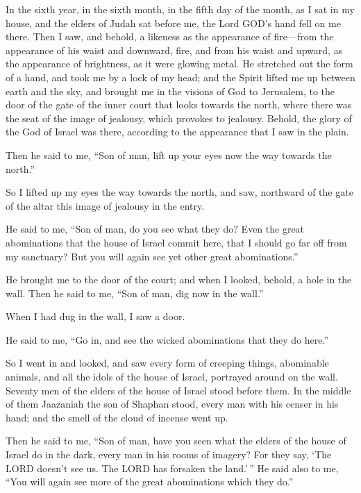  In the sixth year, in the sixth month, in the fifth day
of the month, as I sat in my house, and the elders of Judah sat before
me, the Lord GOD's hand fell on me there.  Then I saw, and
behold, a likeness as the appearance of fire---from the appearance of
his waist and downward, fire, and from his waist and upward, as the
appearance of brightness, as it were glowing metal.  He
stretched out the form of a hand, and took me by a lock of my head; and
the Spirit lifted me up between earth and the sky, and brought me in the
visions of God to Jerusalem, to the door of the gate of the inner court
that looks towards the north, where there was the seat of the image of
jealousy, which provokes to jealousy.  Behold, the glory
of the God of Israel was there, according to the appearance that I saw
in the plain.

 Then he said to me, ``Son of man, lift up your eyes now
the way towards the north.''

So I lifted up my eyes the way towards the north, and saw, northward of
the gate of the altar this image of jealousy in the entry.

 He said to me, ``Son of man, do you see what they do?
Even the great abominations that the house of Israel commit here, that I
should go far off from my sanctuary? But you will again see yet other
great abominations.''

 He brought me to the door of the court; and when I
looked, behold, a hole in the wall.  Then he said to me,
``Son of man, dig now in the wall.''

When I had dug in the wall, I saw a door.

 He said to me, ``Go in, and see the wicked abominations
that they do here.''

 So I went in and looked, and saw every form of creeping
things, abominable animals, and all the idols of the house of Israel,
portrayed around on the wall.  Seventy men of the elders
of the house of Israel stood before them. In the middle of them
Jaazaniah the son of Shaphan stood, every man with his censer in his
hand; and the smell of the cloud of incense went up.

 Then he said to me, ``Son of man, have you seen what the
elders of the house of Israel do in the dark, every man in his rooms of
imagery? For they say, `The LORD doesn't see us. The LORD has forsaken
the land.'\,''  He said also to me, ``You will again see
more of the great abominations which they do.''

